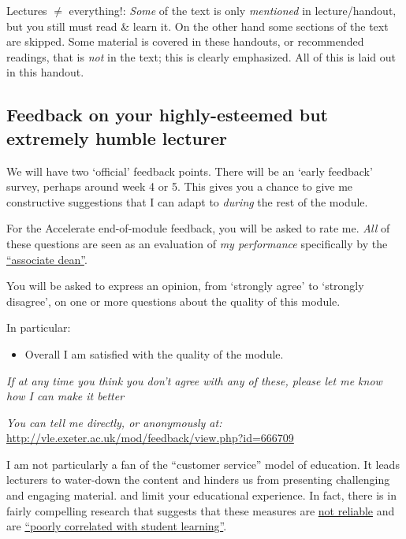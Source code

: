 \documentclass[]{article}
\providecommand{\tightlist}{%
  \setlength{\itemsep}{0pt}\setlength{\parskip}{0pt}}
\begin{document}
Lectures \(\neq\) everything!: \emph{Some} of the text is only \emph{mentioned} in lecture/handout, but you still must read \& learn it. On the other hand some sections of the text are skipped. Some material is covered in these handouts, or recommended readings, that is \emph{not} in the text; this is clearly emphasized. All of this is laid out in this handout.

\hypertarget{feedback-on-your-highly-esteemed-but-extremely-humble-lecturer}{%
\subsection{Feedback on your highly-esteemed but extremely humble lecturer}\label{feedback-on-your-highly-esteemed-but-extremely-humble-lecturer}}

We will have two `official' feedback points. There will be an `early feedback' survey, perhaps around week 4 or 5. This gives you a chance to give me constructive suggestions that I can adapt to \emph{during} the rest of the module.

\bigskip

For the Accelerate end-of-module feedback, you will be asked to rate me.
\emph{All} of these questions are seen as an evaluation of \emph{my performance} specifically by the \href{https://twitter.com/ass_deans?ref_src=twsrc\%5Egoogle\%7Ctwcamp\%5Eserp\%7Ctwgr\%5Eauthor}{``associate dean''}.

You will be asked to express an opinion, from `strongly agree' to `strongly disagree', on one or more questions about the quality of this module.

In particular:

\begin{itemize}
\tightlist
\item
  Overall I am satisfied with the quality of the module.
\end{itemize}

\emph{If at any time you think you don't agree with any of these, please let me know how I can make it better}

\emph{You can tell me directly, or anonymously at:} \url{http://vle.exeter.ac.uk/mod/feedback/view.php?id=666709}

I am not particularly a fan of the ``customer service'' model of education. It leads lecturers to water-down the content and hinders us from presenting challenging and engaging material. and limit your educational experience. In fact, there is in fairly compelling research that suggests that these measures are \href{https://www.tandfonline.com/doi/full/10.1080/2331186X.2017.1304016}{not reliable} and are \href{https://thepsychologist.bps.org.uk/volume-32/april-2019/excellence-or-ease-exploring-student-evaluations-teaching}{``poorly correlated with student learning''}.
\end{document}
